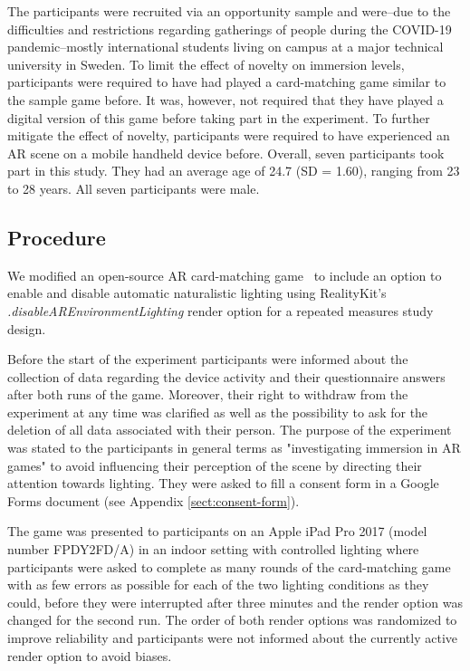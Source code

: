 \documentclass[12pt,twoside,english]{article}
\begin{document}
The participants were recruited via an opportunity sample and were--due to the difficulties and restrictions regarding gatherings of people during the COVID-19 pandemic--mostly international students living on campus at a major technical university in Sweden.
To limit the effect of novelty on immersion levels, participants were required to have had played a card-matching game similar to the sample game before.
It was, however, not required that they have played a digital version of this game before taking part in the experiment.
To further mitigate the effect of novelty, participants were required to have experienced an \gls{AR} scene on a mobile handheld device before.
Overall, seven participants took part in this study.
They had an average age of 24.7 (SD = 1.60), ranging from 23 to 28 years.
All seven participants were male.

\subsection{Procedure}
\label{sect:procedure}

We modified an open-source \gls{AR} card-matching game~\cite{cobb_maxxfrazerrealitykit-cardflip_2020} to include an option to enable and disable automatic naturalistic lighting using RealityKit's \textit{.disableAREnvironmentLighting} render option for a repeated measures study design.

Before the start of the experiment participants were informed about the collection of data regarding the device activity and their questionnaire answers after both runs of the game.
Moreover, their right to withdraw from the experiment at any time was clarified as well as the possibility to ask for the deletion of all data associated with their person.
The purpose of the experiment was stated to the participants in general terms as "investigating immersion in \gls{AR} games" to avoid influencing their perception of the scene by directing their attention towards lighting. 
They were asked to fill a consent form in a Google Forms document (see Appendix \ref{sect:consent-form}).

The game was presented to participants on an Apple iPad Pro 2017 (model number FPDY2FD/A) in an indoor setting with controlled lighting where participants were asked to complete as many rounds of the card-matching game with as few errors as possible for each of the two lighting conditions as they could, before they were interrupted after three minutes and the render option was changed for the second run.
The order of both render options was randomized to improve reliability and participants were not informed about the currently active render option to avoid biases.
\end{document}
